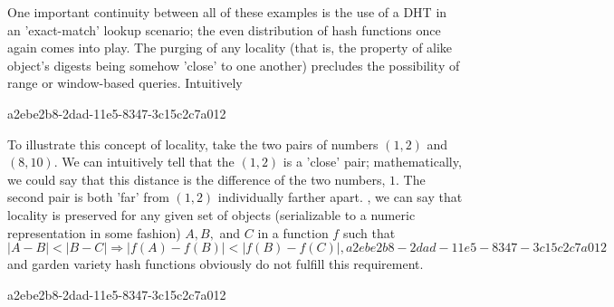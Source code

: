 \documentclass[12pt]{article}
\begin{document}
\par One important continuity between all of these examples is the use of a DHT in an 'exact-match' lookup scenario; the even distribution of hash functions once again comes into play. The purging of any locality (that is, the property of alike object's digests being somehow 'close' to one another) precludes the possibility of range or window-based queries. Intuitively

a2ebe2b8-2dad-11e5-8347-3c15c2c7a012\par To illustrate this concept of locality, take the two pairs of numbers $(1,2)$ and $(8,10)$. We can intuitively tell that the $(1,2)$ is a 'close' pair; mathematically, we could say that this distance is the difference of the two numbers, $1$. The second pair is both 'far' from $(1,2)$ individually farther apart. , we can say that locality is preserved for any given set of objects (serializable to a numeric representation in some fashion) $A,B,$ and $C$ in a function $f$ such that
\begin{equation}
|A-B| < |B-C| \Rightarrow |f(A)-f(B)| < |f(B) - f(C)|,
a2ebe2b8-2dad-11e5-8347-3c15c2c7a012\end{equation}
and garden variety hash functions obviously do not fulfill this requirement.

a2ebe2b8-2dad-11e5-8347-3c15c2c7a012\printbibliography
\end{document}
